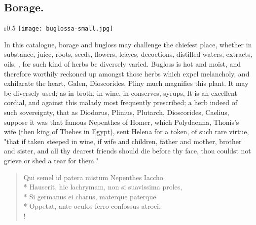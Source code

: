 {%
\clearpage{}

\thispagestyle{titleontop}
\subsection{Borage.}
\begin{wrapfigure}{r}{0.5\textwidth}
  \begingroup
  \texttt{[image: buglossa-small.jpg]}
  \label{fig:buglosa}
\end{wrapfigure}

In this catalogue, borage and bugloss may challenge the chiefest place, whether in substance, juice, roots, seeds, flowers, leaves, decoctions, distilled waters, extracts, oils, \etc{}, for such kind of herbs be diversely varied. Bugloss is hot and moist, and therefore worthily reckoned up amongst those herbs which expel melancholy, and exhilarate the heart, Galen,  Dioscorides,  Pliny much magnifies this plant. It may be diversely used; as in broth, in wine, in conserves, syrups, \etc{} It is an excellent cordial, and against this malady most frequently prescribed; a herb indeed of such sovereignty, that as Diodorus,  Plinius,  Plutarch,  Dioscorides,  Caelius,  suppose it was that famous Nepenthes of Homer, which Polydaenna, Thonis's wife (then king of Thebes in Egypt), sent Helena for a token, of such rare virtue, "that if taken steeped in wine, if wife and children, father and mother, brother and sister, and all thy dearest friends should die before thy face, thou couldst not grieve or shed a tear for them."

\begin{latin}
\begin{verse}%
Qui semel id patera mistum Nepenthes Iaccho\\*
Hauserit, hic lachrymam, non si suavissima proles,\\*
Si germanus ei charus, materque paterque\\*
Oppetat, ante oculos ferro confossus atroci.\\!
\end{verse}%
\end{latin}

}
